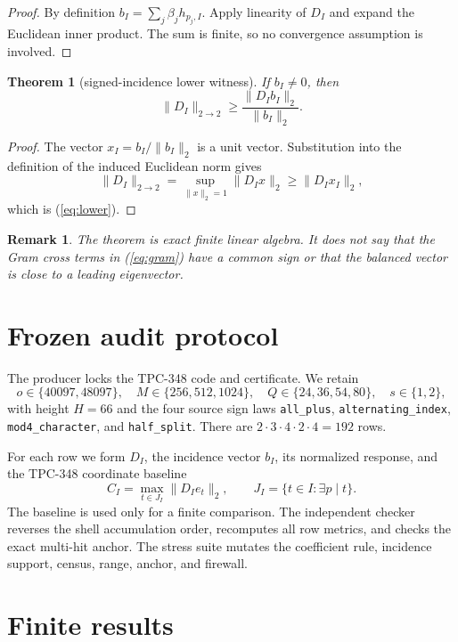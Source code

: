 \documentclass[10pt]{article}
\newtheorem{theorem}{Theorem}
\newtheorem{remark}{Remark}
\begin{document}
\begin{proof}
By definition $b_I=\sum_j\beta_jh_{p_j,I}$.  Apply linearity of $D_I$ and
expand the Euclidean inner product.  The sum is finite, so no convergence
assumption is involved.
\end{proof}

\begin{theorem}[signed-incidence lower witness]
If $b_I\ne0$, then
\begin{equation}
 \|D_I\|_{2\to2}\geq
 \frac{\|D_Ib_I\|_2}{\|b_I\|_2}.
 \label{eq:lower}
\end{equation}
\end{theorem}

\begin{proof}
The vector $x_I=b_I/\|b_I\|_2$ is a unit vector.  Substitution into the
definition of the induced Euclidean norm \cite{conway2000} gives
\[
 \|D_I\|_{2\to2}=\sup_{\|x\|_2=1}\|D_Ix\|_2
 \geq \|D_Ix_I\|_2,
\]
which is (\ref{eq:lower}).
\end{proof}

\begin{remark}
The theorem is exact finite linear algebra.  It does not say that the Gram
cross terms in (\ref{eq:gram}) have a common sign or that the balanced vector
is close to a leading eigenvector.
\end{remark}

\section{Frozen audit protocol}

The producer locks the TPC-348 code and certificate.  We retain
\[
 o\in\{40097,48097\},\quad M\in\{256,512,1024\},\quad
 Q\in\{24,36,54,80\},\quad s\in\{1,2\},
\]
with height $H=66$ and the four source sign laws
\texttt{all\_plus}, \texttt{alternating\_index},
\texttt{mod4\_character}, and \texttt{half\_split}.  There are
$2\cdot3\cdot4\cdot2\cdot4=192$ rows.

For each row we form $D_I$, the incidence vector $b_I$, its normalized response,
and the TPC-348 coordinate baseline
\[
 C_I=\max_{t\in J_I}\|D_Ie_t\|_2,
 \qquad J_I=\{t\in I:\exists p\mid t\}.
\]
The baseline is used only for a finite comparison.  The independent checker
reverses the shell accumulation order, recomputes all row metrics, and checks
the exact multi-hit anchor.  The stress suite mutates the coefficient rule,
incidence support, census, range, anchor, and firewall.

\section{Finite results}
\end{document}
